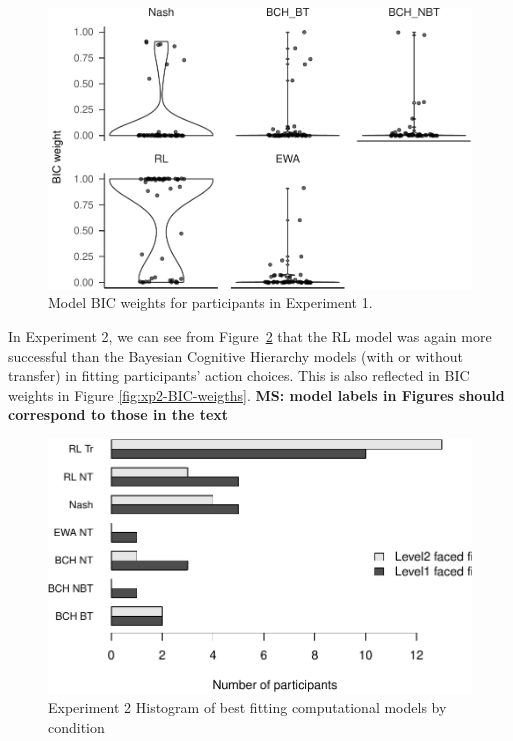 \documentclass[
  english,
  man,floatsintext]{apa6}
\begin{document}
\begin{figure}

{\centering \includegraphics{paper_draft_2021_files/figure-latex/xp1-BIC-weigths-1} 

}

\caption{Model BIC weights for participants in Experiment 1.}\label{fig:xp1-BIC-weigths}
\end{figure}

In Experiment 2, we can see from Figure~\ref{fig:exp2-comp-models} that the RL model was again more successful than the Bayesian Cognitive Hierarchy models (with or without transfer) in fitting participants' action choices. This is also reflected in BIC weights in Figure \ref{fig:xp2-BIC-weigths}. \textbf{MS: model labels in Figures should correspond to those in the text}

\begin{figure}

{\centering \includegraphics[width=\textwidth]{paper_draft_2021_files/figure-latex/exp2-comp-models-1} 

}

\caption{Experiment 2 Histogram of best fitting computational models by condition}\label{fig:exp2-comp-models}
\end{figure}
\end{document}
